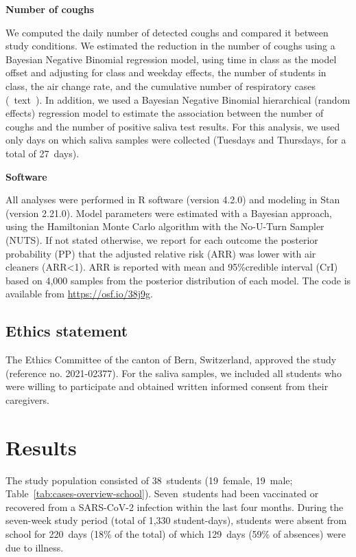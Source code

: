 \documentclass[fleqn,11pt]{wlscirep}
\begin{document}
\noindent\textbf{Number of coughs} \smallskip

\noindent We computed the daily number of detected coughs and compared it between study conditions. We estimated the reduction in the number of coughs using a Bayesian Negative Binomial regression model, using time in class as the model offset and adjusting for class and weekday effects, the number of students in class, the air change rate, and the cumulative number of respiratory cases (\supp~text~). In addition, we used a Bayesian Negative Binomial hierarchical (random effects) regression model to estimate the association between the number of coughs and the number of positive saliva test results. For this analysis, we used only days on which saliva samples were collected (Tuesdays and Thursdays, for a total of 27~days).  \medskip

\noindent\textbf{Software} \smallskip

\noindent All analyses were performed in R software (version 4.2.0)\cite{RCoreTeam2022} and modeling in Stan (version 2.21.0)\cite{Carpenter2017}. Model parameters were estimated with a Bayesian approach, using the Hamiltonian Monte Carlo algorithm with the No-U-Turn Sampler (NUTS)\cite{Hoffman2014}. If not stated otherwise, we report for each outcome the posterior probability (PP) that the adjusted relative risk (ARR) was lower with air cleaners (ARR<1). ARR is reported with mean and 95\%credible interval (CrI) based on 4,000 samples from the posterior distribution of each model. The code is available from \url{https://osf.io/38j9g}.


\subsection{Ethics statement}

\noindent The Ethics Committee of the canton of Bern, Switzerland, approved the study (reference no. 2021-02377). For the saliva samples, we included all students who were willing to participate and obtained written informed consent from their caregivers.


\newpage

\section{Results}

The study population consisted of 38~students (19~female, 19~male; Table~\ref{tab:cases-overview-school}). Seven~students had been vaccinated or recovered from a SARS-CoV-2 infection within the last four months. During the seven-week study period (total of 1,330 student-days), students were absent from school for 220~days (18\% of the total) of which 129~days (59\% of absences) were due to illness.  
\end{document}
